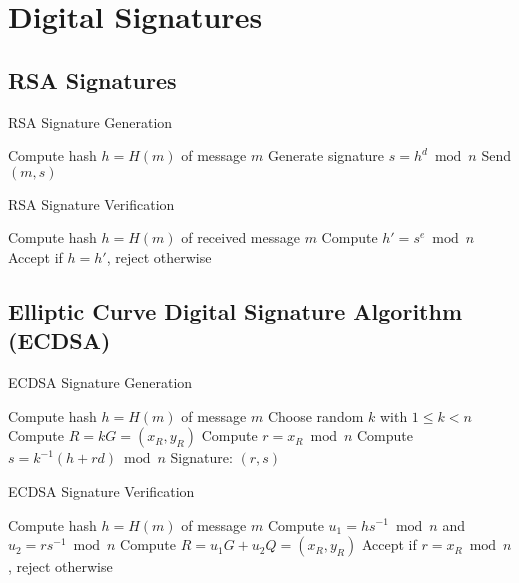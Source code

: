 \documentclass[11pt,a4paper]{article}
\begin{document}
\section{Digital Signatures}

\subsection{RSA Signatures}

\begin{algorithm}
\caption{RSA Signature Generation}
\begin{algorithmic}[1]
\STATE Compute hash $h = H(m)$ of message $m$
\STATE Generate signature $s = h^d \bmod n$
\STATE Send $(m, s)$
\end{algorithmic}
\end{algorithm}

\begin{algorithm}
\caption{RSA Signature Verification}
\begin{algorithmic}[1]
\STATE Compute hash $h = H(m)$ of received message $m$
\STATE Compute $h' = s^e \bmod n$
\STATE Accept if $h = h'$, reject otherwise
\end{algorithmic}
\end{algorithm}

\subsection{Elliptic Curve Digital Signature Algorithm (ECDSA)}

\begin{algorithm}
\caption{ECDSA Signature Generation}
\begin{algorithmic}[1]
\STATE Compute hash $h = H(m)$ of message $m$
\STATE Choose random $k$ with $1 \leq k < n$
\STATE Compute $R = kG = (x_R, y_R)$
\STATE Compute $r = x_R \bmod n$
\STATE Compute $s = k^{-1}(h + rd) \bmod n$
\STATE Signature: $(r, s)$
\end{algorithmic}
\end{algorithm}

\begin{algorithm}
\caption{ECDSA Signature Verification}
\begin{algorithmic}[1]
\STATE Compute hash $h = H(m)$ of message $m$
\STATE Compute $u_1 = hs^{-1} \bmod n$ and $u_2 = rs^{-1} \bmod n$
\STATE Compute $R = u_1G + u_2Q = (x_R, y_R)$
\STATE Accept if $r = x_R \bmod n$, reject otherwise
\end{algorithmic}
\end{algorithm}
\end{document}
